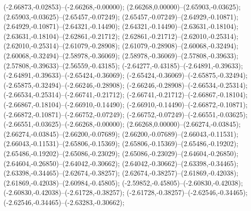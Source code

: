  (-2.66873,-0.02853)--(-2.66268,-0.00000);
 (2.66268,0.00000)--(2.65903,-0.03625);
 (2.65903,-0.03625)--(2.65457,-0.07249);
 (2.65457,-0.07249)--(2.64929,-0.10871);
 (2.64929,-0.10871)--(2.64321,-0.14490);
 (2.64321,-0.14490)--(2.63631,-0.18104);
 (2.63631,-0.18104)--(2.62861,-0.21712);
 (2.62861,-0.21712)--(2.62010,-0.25314);
 (2.62010,-0.25314)--(2.61079,-0.28908);
 (2.61079,-0.28908)--(2.60068,-0.32494);
 (2.60068,-0.32494)--(2.58978,-0.36069);
 (2.58978,-0.36069)--(2.57808,-0.39633);
 (2.57808,-0.39633)--(2.56559,-0.43185);
 (-2.64277,-0.43185)--(-2.64891,-0.39633);
 (-2.64891,-0.39633)--(-2.65424,-0.36069);
 (-2.65424,-0.36069)--(-2.65875,-0.32494);
 (-2.65875,-0.32494)--(-2.66246,-0.28908);
 (-2.66246,-0.28908)--(-2.66534,-0.25314);
 (-2.66534,-0.25314)--(-2.66741,-0.21712);
 (-2.66741,-0.21712)--(-2.66867,-0.18104);
 (-2.66867,-0.18104)--(-2.66910,-0.14490);
 (-2.66910,-0.14490)--(-2.66872,-0.10871);
 (-2.66872,-0.10871)--(-2.66752,-0.07249);
 (-2.66752,-0.07249)--(-2.66551,-0.03625);
 (-2.66551,-0.03625)--(-2.66268,-0.00000);
 (2.66268,0.00000)--(2.66274,-0.03845);
 (2.66274,-0.03845)--(2.66200,-0.07689);
 (2.66200,-0.07689)--(2.66043,-0.11531);
 (2.66043,-0.11531)--(2.65806,-0.15369);
 (2.65806,-0.15369)--(2.65486,-0.19202);
 (2.65486,-0.19202)--(2.65086,-0.23029);
 (2.65086,-0.23029)--(2.64604,-0.26850);
 (2.64604,-0.26850)--(2.64042,-0.30662);
 (2.64042,-0.30662)--(2.63398,-0.34465);
 (2.63398,-0.34465)--(2.62674,-0.38257);
 (2.62674,-0.38257)--(2.61869,-0.42038);
 (2.61869,-0.42038)--(2.60984,-0.45805);
 (-2.59852,-0.45805)--(-2.60830,-0.42038);
 (-2.60830,-0.42038)--(-2.61728,-0.38257);
 (-2.61728,-0.38257)--(-2.62546,-0.34465);
 (-2.62546,-0.34465)--(-2.63283,-0.30662);
